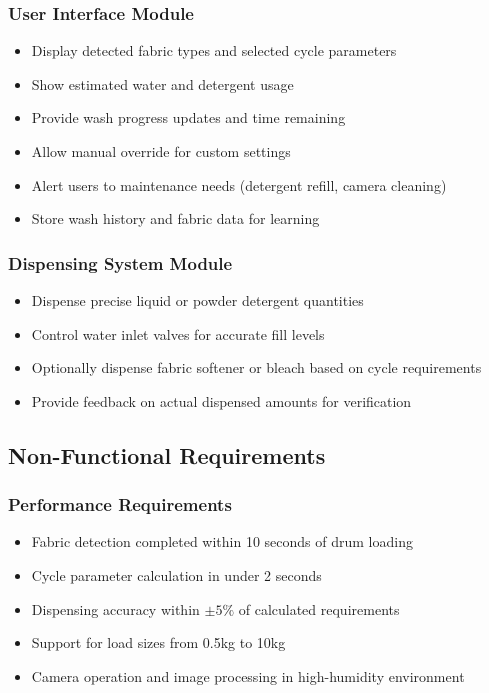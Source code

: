 \subsubsection{User Interface Module}
\begin{itemize}
    \item Display detected fabric types and selected cycle parameters
    \item Show estimated water and detergent usage
    \item Provide wash progress updates and time remaining
    \item Allow manual override for custom settings
    \item Alert users to maintenance needs (detergent refill, camera cleaning)
    \item Store wash history and fabric data for learning
\end{itemize}

\subsubsection{Dispensing System Module}
\begin{itemize}
    \item Dispense precise liquid or powder detergent quantities
    \item Control water inlet valves for accurate fill levels
    \item Optionally dispense fabric softener or bleach based on cycle requirements
    \item Provide feedback on actual dispensed amounts for verification
\end{itemize}

\subsection{Non-Functional Requirements}

\subsubsection{Performance Requirements}
\begin{itemize}
    \item Fabric detection completed within 10 seconds of drum loading
    \item Cycle parameter calculation in under 2 seconds
    \item Dispensing accuracy within \(\pm5\%\) of calculated requirements
    \item Support for load sizes from 0.5kg to 10kg
    \item Camera operation and image processing in high-humidity environment
\end{itemize}

